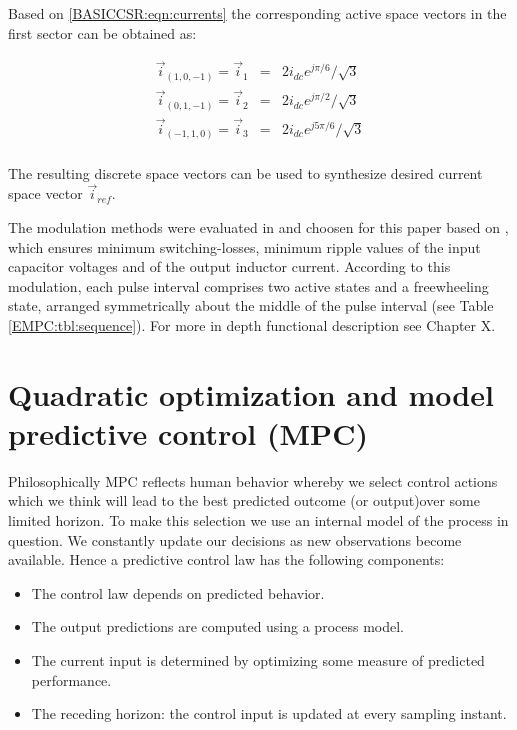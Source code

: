 		Based on \ref{BASICCSR:eqn:currents} the corresponding active space vectors in the first sector can be obtained as:
		
		\begin{equation}
        \begin{array}{rcl}
            \vec{i}_{(1,0,-1)}=\vec{i}_1&=&2i_{dc}e^{j\pi/6}/\sqrt{3}\\
						\vec{i}_{(0,1,-1)}=\vec{i}_2&=&2i_{dc}e^{j\pi/2}/\sqrt{3}\\
						\vec{i}_{(-1,1,0)}=\vec{i}_3&=&2i_{dc}e^{j5\pi/6}/\sqrt{3}\\
        \end{array}
        \label{BASICCSR:eqn:currents}
    \end{equation}
		
		The resulting discrete space vectors can be used to synthesize desired current
space vector $\vec{i}_{ref}$. 

The modulation methods were evaluated in and choosen for this paper based on \cite{moussaoui2005open}, which ensures minimum switching-losses, minimum ripple values of the input capacitor voltages and of the output inductor current. According to this modulation, each pulse interval comprises two active states and a freewheeling state, arranged symmetrically about the middle of the pulse interval (see Table \ref{EMPC:tbl:sequence}). For more in depth functional description see Chapter X.

\section{Quadratic optimization and model predictive control (MPC)}\label{BASICCSR:sec:MPC}

Philosophically MPC reflects human behavior whereby we select control actions which we think will lead to the best predicted outcome (or output)over some limited horizon. To make this selection we use an internal model of the process in question. We constantly update our decisions as new observations become available. Hence a predictive control law has the following components:
\begin{itemize}
\item The control law depends on predicted behavior.
\item The output predictions are computed using a process model.
\item The current input is determined by optimizing some measure of predicted performance.
\item The receding horizon: the control input is updated at every sampling instant.
\end{itemize}

